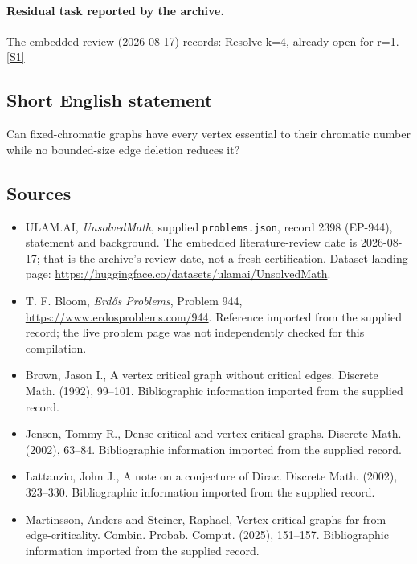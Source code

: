 \documentclass[11pt,a4paper]{article}
\newcommand{\sref}[2]{\hyperlink{source:#1:#2}{[S#2]}}
\begin{document}
\paragraph{Residual task reported by the archive.}

The embedded review (2026-08-17) records: Resolve k=4, already open for r=1. \sref{2398}{1}

\subsection{Short English statement}

Can fixed-chromatic graphs have every vertex essential to their chromatic number while no bounded-size edge deletion reduces it?

\subsection{Sources}

{\small

\begin{itemize}

\item[\hypertarget{source:2398:1}{S1}] ULAM.AI, \emph{UnsolvedMath}, supplied \texttt{problems.json}, record 2398 (EP-944), statement and background. The embedded literature-review date is 2026-08-17; that is the archive’s review date, not a fresh certification. Dataset landing page: \url{https://huggingface.co/datasets/ulamai/UnsolvedMath}.

\item[\hypertarget{source:2398:2}{S2}] T. F. Bloom, \emph{Erdős Problems}, Problem 944, \url{https://www.erdosproblems.com/944}. Reference imported from the supplied record; the live problem page was not independently checked for this compilation.

\item[\hypertarget{source:2398:3}{S3}] Brown, Jason I., A vertex critical graph without critical edges. Discrete Math. (1992), 99--101. Bibliographic information imported from the supplied record.

\item[\hypertarget{source:2398:4}{S4}] Jensen, Tommy R., Dense critical and vertex-critical graphs. Discrete Math. (2002), 63--84. Bibliographic information imported from the supplied record.

\item[\hypertarget{source:2398:5}{S5}] Lattanzio, John J., A note on a conjecture of {D}irac. Discrete Math. (2002), 323--330. Bibliographic information imported from the supplied record.

\item[\hypertarget{source:2398:6}{S6}] Martinsson, Anders and Steiner, Raphael, Vertex-critical graphs far from edge-criticality. Combin. Probab. Comput. (2025), 151--157. Bibliographic information imported from the supplied record.

\end{itemize}

}

\label{end:2398}
\end{document}
